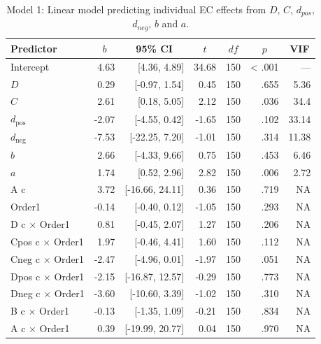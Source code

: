 \documentclass[
  man,floatsintext]{apa6}
\begin{document}
\begin{table}[tbp]

\begin{center}
\begin{threeparttable}

\caption{\label{tab:unnamed-chunk-20}Model 1: Linear model predicting individual EC effects from $D$, $C$, $d_{pos}$, $d_{neg}$, $b$ and $a$.}

\begin{tabular}{lrrrrrr}
\toprule
Predictor & \multicolumn{1}{c}{$b$} & \multicolumn{1}{c}{95\% CI} & \multicolumn{1}{c}{$t$} & \multicolumn{1}{c}{$\mathit{df}$} & \multicolumn{1}{c}{$p$} & \multicolumn{1}{c}{VIF}\\
\midrule
Intercept & 4.63 & {}[4.36, 4.89] & 34.68 & 150 & < .001 & ---\\
$D$ & 0.29 & {}[-0.97, 1.54] & 0.45 & 150 & .655 & 5.36\\
$C$ & 2.61 & {}[0.18, 5.05] & 2.12 & 150 & .036 & 34.4\\
$d_{\mathrm{pos}}$ & -2.07 & {}[-4.55, 0.42] & -1.65 & 150 & .102 & 33.14\\
$d_{\mathrm{neg}}$ & -7.53 & {}[-22.25, 7.20] & -1.01 & 150 & .314 & 11.38\\
$b$ & 2.66 & {}[-4.33, 9.66] & 0.75 & 150 & .453 & 6.46\\
$a$ & 1.74 & {}[0.52, 2.96] & 2.82 & 150 & .006 & 2.72\\
A c & 3.72 & {}[-16.66, 24.11] & 0.36 & 150 & .719 & NA\\
Order1 & -0.14 & {}[-0.40, 0.12] & -1.05 & 150 & .293 & NA\\
D c $\times$ Order1 & 0.81 & {}[-0.45, 2.07] & 1.27 & 150 & .206 & NA\\
Cpos c $\times$ Order1 & 1.97 & {}[-0.46, 4.41] & 1.60 & 150 & .112 & NA\\
Cneg c $\times$ Order1 & -2.47 & {}[-4.96, 0.01] & -1.97 & 150 & .051 & NA\\
Dpos c $\times$ Order1 & -2.15 & {}[-16.87, 12.57] & -0.29 & 150 & .773 & NA\\
Dneg c $\times$ Order1 & -3.60 & {}[-10.60, 3.39] & -1.02 & 150 & .310 & NA\\
B c $\times$ Order1 & -0.13 & {}[-1.35, 1.09] & -0.21 & 150 & .834 & NA\\
A c $\times$ Order1 & 0.39 & {}[-19.99, 20.77] & 0.04 & 150 & .970 & NA\\
\bottomrule
\end{tabular}

\end{threeparttable}
\end{center}

\end{table}
\end{document}
